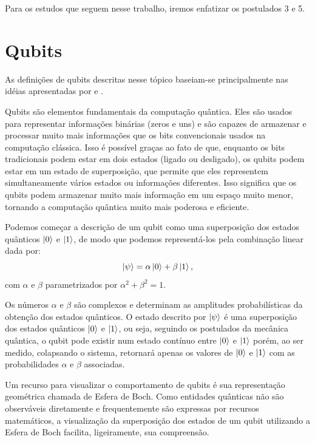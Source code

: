 Para os estudos que seguem nesse trabalho, iremos enfatizar os postulados 3 e 5.


\section{Qubits}

As definições de qubits descritas nesse tópico baseiam-se principalmente nas idéias apresentadas por \textcite{chuang} e \textcite{CompInfoQuantica}.

Qubits são elementos fundamentais da computação quântica. Eles são usados para representar informações binárias (zeros e uns) e são capazes de armazenar e processar muito mais informações que os bits convencionais usados na computação clássica. Isso é possível graças ao fato de que, enquanto os bits tradicionais podem estar em dois estados (ligado ou desligado), os qubits podem estar em um estado de superposição, que permite que eles representem simultaneamente vários estados ou informações diferentes. Isso significa que os qubits podem armazenar muito mais informação em um espaço muito menor, tornando a computação quântica muito mais poderosa e eficiente.

Podemos começar a descrição de um qubit como uma superposição dos estados quânticos $\ket{0}$ e $\ket{1}$, de modo que podemos representá-los pela combinação linear dada por:
\begin{equation}\label{psi}
\ket{\psi} = \alpha \ket{0} + \beta \ket{1},
\end{equation}
com $\alpha$ e $\beta$ parametrizados por \(\alpha^{2} + \beta^{2} = 1\).

Os números $\alpha$ e $\beta$ são complexos e determinam as amplitudes probabilísticas da obtenção dos estados quânticos.
O estado descrito por $\ket{\psi}$ é uma superposição dos estados quânticos $\ket{0}$ e $\ket{1}$, ou seja, seguindo os postulados da mecânica quântica, o qubit pode existir num estado contínuo entre $\ket{0}$ e $\ket{1}$ porém, ao ser medido, colapsando o sistema, retornará apenas os valores de $\ket{0}$ e $\ket{1}$ com as probabilidades $\alpha$ e $\beta$ associadas.

Um recurso para visualizar o comportamento de qubits é sua representação geométrica chamada de Esfera de Boch. Como entidades quânticas não são observáveis diretamente e frequentemente são expressas por recursos matemáticos, a visualização da superposição dos estados de um qubit utilizando a Esfera de Boch facilita, ligeiramente, sua compreensão.

